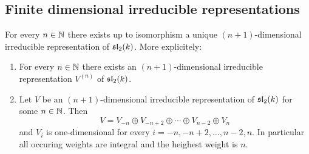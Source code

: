 \subsection{Finite dimensional irreducible representations}


\begin{thrm}
 For every $n \in \mathbb{N}$ there exists up to isomorphism a unique $(n+1)$-dimensional irreducible representation of $\mathfrak{sl}_2(k)$. More explicitely:
 \begin{enumerate}[leftmargin=*]
  \item
   For every $n \in \mathbb{N}$ there exists an $(n+1)$-dimensional irreducible representation $V^{(n)}$ of $\mathfrak{sl}_2(k)$.
  \item
   Let $V$ be an $(n+1)$-dimensional irreducible representation of $\mathfrak{sl}_2(k)$ for some $n \in \mathbb{N}$. Then
   \[
    V = V_{-n} \oplus V_{-n+2} \oplus \dotsb \oplus V_{n-2} \oplus V_n
   \]
   and $V_i$ is one-dimensional for every $i = -n, -n+2, \dotsc, n-2, n$. In particular all occuring weights are integral and the heighest weight is $n$.
   

\end{enumerate}
\end{thrm}
